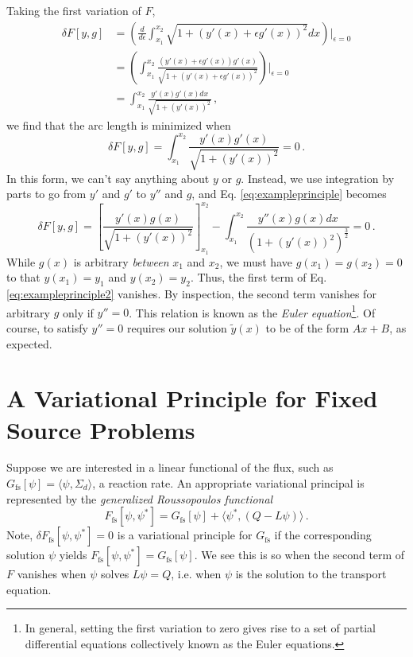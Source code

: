 Taking the first variation of $F$,
\begin{equation}
\begin{split}
\delta F[y,g] &= \left ( \frac{d}{d\epsilon}\int^{x_2}_{x_1} 
                         \sqrt{1 + (y'(x)+\epsilon g'(x))^2} dx \right ) 
                 \Bigg |_{\epsilon=0} \\
              &= \left ( \int^{x_2}_{x_1} 
                         \frac{(y'(x)+\epsilon g'(x))g'(x)}
                              {\sqrt{1 + (y'(x)+\epsilon g'(x))^2}} \right ) 
                 \Bigg |_{\epsilon=0} \\
              &= \int^{x_2}_{x_1} \frac{y'(x)g'(x)dx}{\sqrt{1 + (y'(x))^2}} \, ,
\end{split}
\end{equation}
we find that the arc length is minimized when
\begin{equation}
 \delta F[y,g] =
   \int^{x_2}_{x_1}\frac{y'(x)g'(x)}{\sqrt{1 + (y'(x))^2}} = 0 \, .
 \label{eq:exampleprinciple}
\end{equation}
In this form, we can't say anything about $y$ or $g$.  Instead, we use 
integration by parts to go from $y'$ and $g'$ to $y''$ and $g$, and
Eq. \ref{eq:exampleprinciple} becomes
\begin{equation}
 \delta F[y,g] =
   \left [ \frac{y'(x)g(x)}{\sqrt{1 + (y'(x))^2}} \right ]^{x_2}_{x_1} - 
   \int^{x_2}_{x_1} \frac{y''(x)g(x)dx}{(1 + (y'(x))^2)^{\frac{3}{2}}} = 0\, .
 \label{eq:exampleprinciple2}
\end{equation}
While $g(x)$ is arbitrary \textit{between} $x_1$ and $x_2$, we must have 
$g(x_1) = g(x_2) = 0$ to that $y(x_1) = y_1$ and $y(x_2) = y_2$.  Thus, the 
first term of Eq. \ref{eq:exampleprinciple2} vanishes. 
By inspection, the second term vanishes for 
arbitrary $g$ only if $y'' = 0$.  This relation is known as 
the \textit{Euler equation}\footnote{In general, setting the first variation 
to zero gives rise to a set of partial differential equations collectively 
known as the Euler equations.}.  Of course, to satisfy $y''=0$ requires 
our solution $\tilde{y}(x)$ to be of the form $Ax+B$, as expected.

\section*{A Variational Principle for Fixed Source Problems}

Suppose we are interested in a linear functional of the flux, such 
as $G_{\text{fs}}[\psi] = \langle \psi, \Sigma_d \rangle$, a reaction rate. 
An appropriate variational principal is represented by 
the \textit{generalized Roussopoulos functional}
\begin{equation}
 F_{\text{fs}} [\psi,\psi^*] = G_{\text{fs}}[\psi] + \langle \psi^*, (Q-L\psi) \rangle \, .
\end{equation}
Note, $\delta F_{\text{fs}}[\psi,\psi^*] = 0$ is a variational principle 
for $G_{\text{fs}}$ if the corresponding solution $\psi$ 
yields $F_{\text{fs}}[\psi,\psi^*] = G_{\text{fs}}[\psi]$.  We see this is so when 
the second term of $F$ vanishes when $\psi$ solves $L\psi = Q$, i.e. 
when $\psi$ is the solution to the transport equation.

